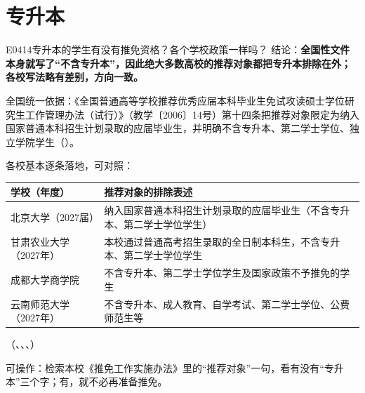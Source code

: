 \section{专升本}
\begin{qa}{E0414}{专升本的学生有没有推免资格？各个学校政策一样吗？}
结论：\textbf{全国性文件本身就写了“不含专升本”，因此绝大多数高校的推荐对象都把专升本排除在外；各校写法略有差别，方向一致。}

全国统一依据：《全国普通高等学校推荐优秀应届本科毕业生免试攻读硕士学位研究生工作管理办法（试行）》（教学〔2006〕14号）第十四条把推荐对象限定为纳入国家普通本科招生计划录取的应届毕业生，并明确不含专升本、第二学士学位、独立学院学生（）。

各校基本逐条落地，可对照：

\par\vspace{2pt}\nobreak\begin{center}\footnotesize
\begin{tabularx}{\textwidth}{>{\raggedright\arraybackslash}X>{\raggedright\arraybackslash}X}
\toprule
\textbf{学校（年度）} & \textbf{推荐对象的排除表述} \\ \midrule
北京大学（2027届） & 纳入国家普通本科招生计划录取的应届毕业生（不含专升本、第二学士学位学生） \\
甘肃农业大学（2027年） & 本校通过普通高考招生录取的全日制本科生，不含专升本、第二学士学位学生 \\
成都大学商学院 & 不含专升本、第二学士学位学生及国家政策不予推免的学生 \\
云南师范大学（2027年） & 不含专升本、成人教育、自学考试、第二学士学位、公费师范生等 \\
\bottomrule
\end{tabularx}
\end{center}\vspace{2pt}\par

（、、、）

可操作：检索本校《推免工作实施办法》里的“推荐对象”一句，看有没有“专升本”三个字；有，就不必再准备推免。
\end{qa}

